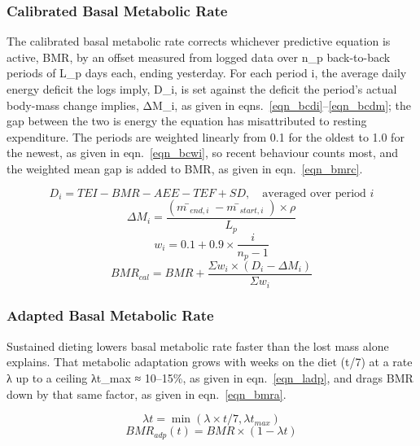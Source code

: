 \subsubsection{Calibrated Basal Metabolic Rate}

The calibrated basal metabolic rate corrects whichever predictive equation is active, BMR, by an offset measured from logged data over n\_p back-to-back periods of L\_p days each, ending yesterday. For each period i, the average daily energy deficit the logs imply, D\_i, is set against the deficit the period's actual body-mass change implies, ΔM\_i, as given in eqns.~\eqref{eqn_bcdi}–\eqref{eqn_bcdm}; the gap between the two is energy the equation has misattributed to resting expenditure. The periods are weighted linearly from 0.1 for the oldest to 1.0 for the newest, as given in eqn.~\eqref{eqn_bcwi}, so recent behaviour counts most, and the weighted mean gap is added to BMR, as given in eqn.~\eqref{eqn_bmrc}.

\begin{equation}
\label{eqn_bcdi}
D_{i} = TEI − BMR − AEE − TEF + SD, \quad \text{averaged over period } i
\end{equation}
\begin{equation}
\label{eqn_bcdm}
ΔM_{i} = \frac{(m̄_{end,i} − m̄_{start,i}) × ρ}{L_{p}}
\end{equation}
\begin{equation}
\label{eqn_bcwi}
w_{i} = 0.1 + 0.9 × \frac{i}{n_{p} − 1}
\end{equation}
\begin{equation}
\label{eqn_bmrc}
BMR_{cal} = BMR + \frac{Σ w_{i} × (D_{i} − ΔM_{i})}{Σ w_{i}}
\end{equation}

\subsubsection{Adapted Basal Metabolic Rate}

Sustained dieting lowers basal metabolic rate faster than the lost mass alone explains. That metabolic adaptation grows with weeks on the diet (t/7) at a rate λ up to a ceiling λt\_max ≈ 10–15\%, as given in eqn.~\eqref{eqn_ladp}, and drags BMR down by that same factor, as given in eqn.~\eqref{eqn_bmra}.

\begin{equation}
\label{eqn_ladp}
λt = \min(λ × t/7, λt_{max})
\end{equation}
\begin{equation}
\label{eqn_bmra}
BMR_{adp}(t) = BMR × (1 − λt)
\end{equation}

